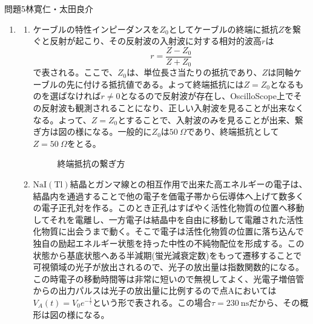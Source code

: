 \documentclass[fleqn]{jbook}
\begin{document}
\begin{answer}{問題5}{林寛仁・太田良介}
\begin{enumerate}
\begin{itemize}
\end{itemize}
\item 
\begin{enumerate}
	\item ケーブルの特性インピーダンスを$Z_0$としてケーブルの終端に抵抗$Z$を繋ぐと反射が起こり、その反射波の入射波に対する相対的波高$r$は
	\begin{equation}
		r=\frac{Z-Z_0}{Z+Z_0}							\nonumber
	\end{equation}
で表される。ここで、$Z_0$は、単位長さ当たりの抵抗であり、$Z$は同軸ケーブルの先に付ける抵抗値である。よって終端抵抗には$Z=Z_0$となるものを選ばなければ$r\ne 0$となるので反射波が存在し、OscilloScope上でその反射波も観測されることになり、正しい入射波を見ることが出来なくなる。よって、$Z=Z_0$とすることで、入射波のみを見ることが出来、繋ぎ方は図の様になる。一般的に$Z_0$は$50 \ \Omega$であり、終端抵抗として$Z= 50 \ \Omega$をとる。
	\begin{figure}[h]
  		\begin{center}
    	\caption{終端抵抗の繋ぎ方}
  		\end{center}
	\end{figure}
	\item $\mathrm{NaI(Tl)}$結晶とガンマ線との相互作用で出来た高エネルギーの電子は、結晶内を通過することで他の電子を価電子帯から伝導体へ上げて数多くの電子正孔対を作る。このとき正孔はすばやく活性化物質の位置へ移動してそれを電離し、一方電子は結晶中を自由に移動して電離された活性化物質に出会うまで動く。そこで電子は活性化物質の位置に落ち込んで独自の励起エネルギー状態を持った中性の不純物配位を形成する。この状態から基底状態へある半減期(蛍光減衰定数)をもって遷移することで可視領域の光子が放出されるので、光子の放出量は指数関数的になる。この時電子の移動時間等は非常に短いので無視してよく、光電子増倍管からの出力パルスは光子の放出量に比例するので点Aにおいては$V_A(t)=V_0 e^{-\frac{t}{\tau}}$という形で表される。この場合$\tau =230 \ \mathrm{ns}$だから、その概形は図の様になる。

\end{enumerate}
\end{enumerate}
\end{answer}
\end{document}
